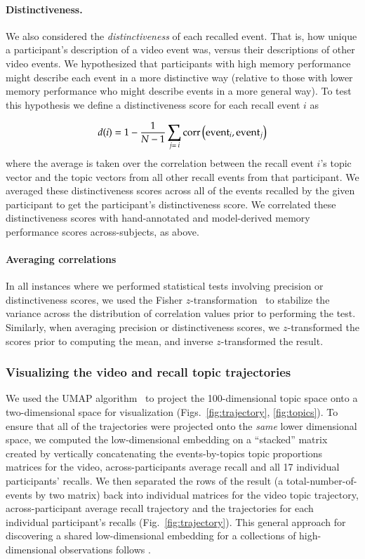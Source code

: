 \documentclass{article}
\begin{document}
\paragraph*{Distinctiveness.}
We also considered the \textit{distinctiveness} of each recalled event. That is, how unique a participant's description of a video event was, versus their descriptions of other video events.  We hypothesized that participants with high memory performance might describe each event in a more distinctive way (relative to those with lower memory performance who might describe events in a more general way).  To test this hypothesis we define a distinctiveness score for each recall event $i$ as

\[
  d(i) = 1 - \frac{1}{N - 1} \sum_{j = \\i}\mathrm{corr}\left(\mathrm{event}_i, \mathrm{event}_j\right) 
\]
where the average is taken over the correlation between the recall event $i$'s topic vector and the topic vectors from all other recall events from that participant.  We averaged these distinctiveness scores across all of the events recalled by the given participant to get the participant's distinctiveness score.  We correlated these distinctiveness scores with hand-annotated and model-derived memory performance scores across-subjects, as above.

\paragraph*{Averaging correlations}
In all instances where we performed statistical tests involving precision or distinctiveness scores, we used the Fisher $z$-transformation~\citep{Fish25} to stabilize the variance across the distribution of correlation values prior to performing the test.  Similarly, when averaging precision or distinctiveness scores, we $z$-transformed the scores prior to computing the mean, and inverse $z$-transformed the result.

\subsubsection*{Visualizing the video and recall topic trajectories}
We used the UMAP algorithm~\citep{McInEtal18} to project the 100-dimensional topic space onto a two-dimensional space for visualization (Figs.~\ref{fig:trajectory}, \ref{fig:topics}).  To ensure that all of the trajectories were projected onto the \textit{same} lower dimensional space, we computed the low-dimensional embedding on a ``stacked'' matrix created by vertically concatenating the events-by-topics topic proportions matrices for the video, across-participants average recall and all 17 individual participants' recalls.  We then separated the rows of the result (a total-number-of-events by two matrix) back into individual matrices for the video topic trajectory, across-participant average recall trajectory and the trajectories for each individual participant's recalls (Fig.~\ref{fig:trajectory}).  This general approach for discovering a shared low-dimensional embedding for a collections of high-dimensional observations follows \cite{HeusEtal18a}.
\end{document}
